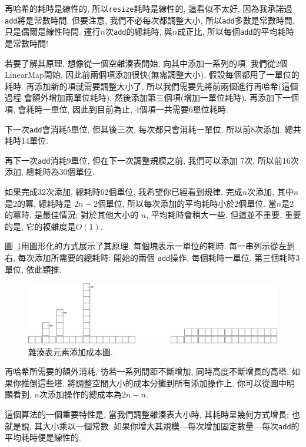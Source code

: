 \documentclass[10pt]{book}
\begin{document}
再哈希的耗時是線性的, 所以{\tt resize}耗時是線性的, 
這看似不太好, 因為我承諾過{\tt add}將是常數時間.
但要注意, 我們不必每次都調整大小, 所以{\tt add}多數是常數時間, 
只是偶爾是線性時間. 運行$n$次{\tt add}的總耗時, 與$n$成正比, 
所以每個{\tt add}的平均耗時是常數時間!

若要了解其原理, 想像從一個空雜湊表開始, 向其中添加一系列的項.
我們從2個LinearMap開始, 因此前兩個項添加很快(無需調整大小).
假設每個都用了一單位的耗時. 
再添加新的項就需要調整大小了, 所以我們需要先將前兩個進行再哈希(這個過程
會額外增加兩單位耗時), 然後添加第三個項(增加一單位耗時).
再添加下一個項, 會耗時一單位, 因此到目前為止, 4個項一共需要6單位耗時.

下一次{\tt add}會消耗5單位, 但其後三次, 每次都只會消耗一單位, 
所以前8次添加, 總共耗時14單位.

再下一次{\tt add}消耗9單位, 但在下一次調整規模之前, 我們可以添加
7次, 所以前16次添加, 總耗時為30個單位. 

如果完成32次添加, 總耗時62個單位, 我希望你已經看到規律.
完成$n$次添加, 其中$n$是2的冪,
總耗時是 $2n-2$個單位, 所以每次添加的平均耗時小於2個單位.
當$n$是2的冪時, 是最佳情況;
對於其他大小的 $n$, 平均耗時會稍大一些, 但這並不重要.
重要的是, 它的複雜度是$O(1)$.

圖~\ref{fig.hash}用圖形化的方式展示了其原理. 
每個塊表示一單位的耗時. 
每一串列示從左到右, 每次添加所需要的總耗時: 開始的兩個
{\tt add}操作, 每個耗時一單位, 第三個耗時3單位, 依此類推. 

\begin{figure}
\centerline{\includegraphics[width=5.5in]{figs/towers.pdf}}
\caption{雜湊表元素添加成本圖.\label{fig.hash}}
\end{figure}

再哈希所需要的額外消耗, 彷若一系列間距不斷增加, 同時高度不斷增長的高塔.
如果你推倒這些塔, 將調整空間大小的成本分攤到所有添加操作上, 
你可以從圖中明顯看到, $n$次添加操作的總成本為$2n-n$.

這個算法的一個重要特性是, 當我們調整雜湊表大小時, 其耗時呈幾何方式增長;
也就是說, 其大小乘以一個常數.
如果你增大其規模---每次增加固定數量---每次{\tt add}的平均耗時便是線性的.
\end{document}
